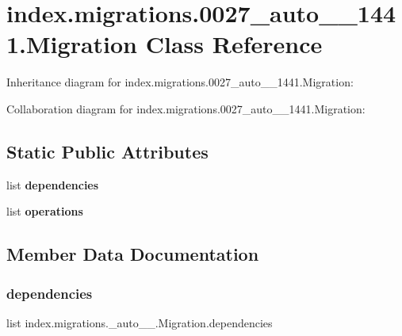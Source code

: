 \hypertarget{classindex_1_1migrations_1_10027__auto__20171028__1441_1_1Migration}{}\section{index.\+migrations.0027\+\_\+auto\+\_\+\_\+1441.Migration Class Reference}
\label{classindex_1_1migrations_1_10027__auto__20171028__1441_1_1Migration}


Inheritance diagram for index.\+migrations.0027\+\_\+auto\+\_\+\_\+1441.Migration\+:


Collaboration diagram for index.\+migrations.0027\+\_\+auto\+\_\+\_\+1441.Migration\+:
\subsection*{Static Public Attributes}
\begin{DoxyCompactItemize}
\item 
list {\bfseries dependencies}
\item 
list {\bfseries operations}
\end{DoxyCompactItemize}


\subsection{Member Data Documentation}
\mbox{\label{classindex_1_1migrations_1_10027__auto__20171028__1441_1_1Migration_a77f8c887e8cd8cf6c56c40643ca3f9b4}} 
\subsubsection{\texorpdfstring{dependencies}{dependencies}}
{\footnotesize\ttfamily list index.\+migrations.\+\_\+auto\+\_\+\_.\+Migration.\+dependencies\hspace{0.3cm}{\ttfamily [static]}}

